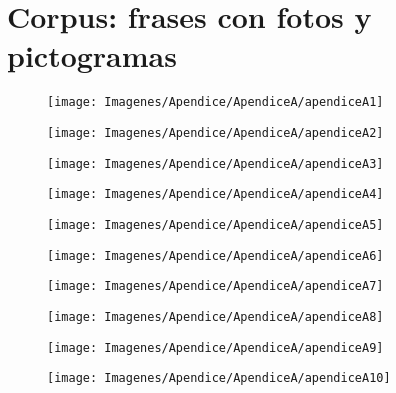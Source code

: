 
\chapter{Corpus: frases con fotos y pictogramas}
\label{Appendix:Key1}

\begin{figure}[h]
  \centering
\texttt{[image: Imagenes/Apendice/ApendiceA/apendiceA1]}
\end{figure}

\begin{figure}[h]
  \centering
\texttt{[image: Imagenes/Apendice/ApendiceA/apendiceA2]}
\end{figure}

\begin{figure}[h]
  \centering
\texttt{[image: Imagenes/Apendice/ApendiceA/apendiceA3]}
\end{figure}

\begin{figure}[h]
  \centering
\texttt{[image: Imagenes/Apendice/ApendiceA/apendiceA4]}
\end{figure}

\begin{figure}[h]
  \centering
\texttt{[image: Imagenes/Apendice/ApendiceA/apendiceA5]}
\end{figure}

\begin{figure}[h]
  \centering
\texttt{[image: Imagenes/Apendice/ApendiceA/apendiceA6]}
\end{figure}

\begin{figure}[h]
  \centering
\texttt{[image: Imagenes/Apendice/ApendiceA/apendiceA7]}
\end{figure}

\begin{figure}[h]
  \centering
\texttt{[image: Imagenes/Apendice/ApendiceA/apendiceA8]}
\end{figure}

\begin{figure}[h]
  \centering
\texttt{[image: Imagenes/Apendice/ApendiceA/apendiceA9]}
\end{figure}

\begin{figure}[h]
  \centering
\texttt{[image: Imagenes/Apendice/ApendiceA/apendiceA10]}
\end{figure}